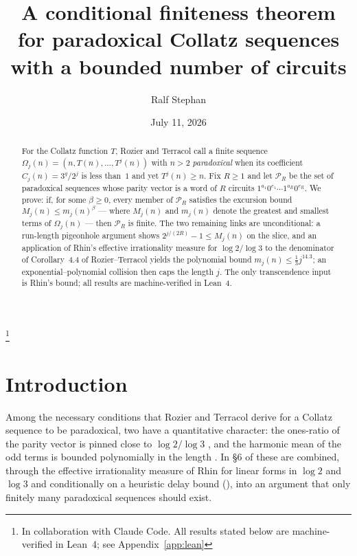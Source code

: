 \documentclass[11pt]{amsart}
\theoremstyle{plain}
\theoremstyle{definition}
\theoremstyle{remark}
\newcommand{\Par}{\mathcal{P}}        %
\newcommand{\ParR}[1]{\Par_{#1}}      %
\begin{document}
\title[Finiteness of paradoxical sequences with bounded circuits]{A conditional finiteness theorem for paradoxical Collatz sequences with a bounded number of circuits}
\author{Ralf Stephan}
\thanks{In collaboration with Claude Code.  All results stated below are
machine-verified in Lean~4; see Appendix~\ref{app:lean}}
\date{July 11, 2026}

\begin{abstract}
For the Collatz function $T$, Rozier and Terracol call a finite sequence
$\Omega_j(n)=(n,T(n),\dots,T^j(n))$ with $n>2$ \emph{paradoxical} when its
coefficient $C_j(n)=3^{q}/2^{j}$ is less than~$1$ and yet $T^j(n)\ge n$.  Fix
$R\ge 1$ and let $\ParR{R}$ be the set of paradoxical sequences whose parity
vector is a word of $R$ circuits $1^{a_1}0^{e_1}\cdots 1^{a_R}0^{e_R}$.  We
prove: if, for some $\beta\ge 0$, every member of $\ParR{R}$ satisfies the
excursion bound $M_j(n)\le m_j(n)^{\beta}$ --- where $M_j(n)$ and $m_j(n)$
denote the greatest and smallest terms of $\Omega_j(n)$ --- then $\ParR{R}$
is finite.  The two remaining links are unconditional: a run-length
pigeonhole argument shows $2^{j/(2R)}-1\le M_j(n)$ on the slice, and an
application of Rhin's effective irrationality measure for $\log 2/\log 3$ to
the denominator of Corollary~4.4 of Rozier--Terracol yields the polynomial
bound $m_j(n)\le\tfrac13 j^{14.3}$; an exponential--polynomial collision then
caps the length $j$.  The only transcendence input is Rhin's bound; all
results are machine-verified in Lean~4.
\end{abstract}

\maketitle

\section{Introduction}\label{sec:intro}

Among the necessary conditions that Rozier and Terracol \cite{Roz25} derive
for a Collatz sequence to be paradoxical, two have a quantitative character:
the ones-ratio of the parity vector is pinned close to $\log 2/\log 3$
\cite[Cor.~4.3]{Roz25}, and the harmonic mean of the odd terms is bounded
polynomially in the length \cite[Cor.~4.4]{Roz25}.  In \S6 of \cite{Roz25}
these are combined, through the effective irrationality measure of Rhin for
linear forms in $\log 2$ and $\log 3$ \cite{Rhi87} and conditionally on a
heuristic delay bound (\cite[Conj.~6.2]{Roz25}), into an argument that only
finitely many paradoxical sequences should exist.
\end{document}
